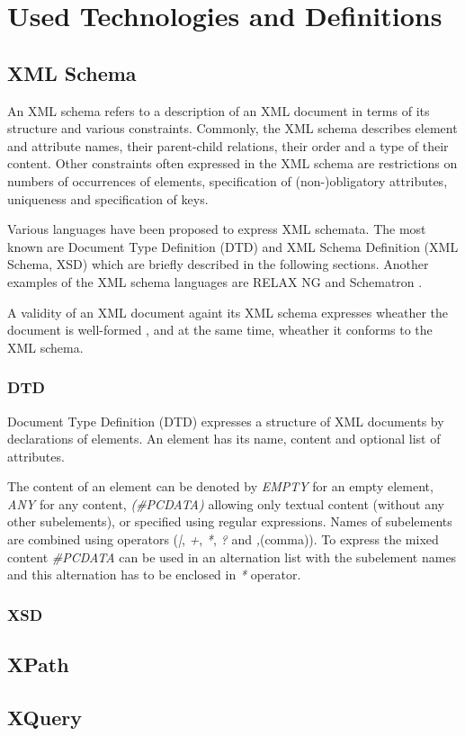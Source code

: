 \chapter{Used Technologies and Definitions}


\section{XML Schema}
An XML schema refers to a description of an XML document in terms of its structure and various constraints. Commonly, the XML schema describes element and attribute names, their parent-child relations, their order and a type of their content. Other constraints often expressed in the XML schema are restrictions on numbers of occurrences of elements, specification of (non-)obligatory attributes, uniqueness and specification of keys.

Various languages have been proposed to express XML schemata. The most known are Document Type Definition (DTD)  and XML Schema Definition (XML Schema, XSD)  which are briefly described in the following sections. Another examples of the XML schema languages are RELAX NG  and  Schematron .

A validity of an XML document againt its XML schema expresses wheather the document is well-formed , and at the same time, wheather it conforms to the XML schema.

\subsection{DTD}
Document Type Definition (DTD) expresses a structure of XML documents by declarations of elements. An element has its name, content and optional list of attributes.

The content of an element can be denoted by \emph{EMPTY} for an empty element, \emph{ANY} for any content, \emph{(\#PCDATA)} allowing only textual content (without any other subelements), or specified using regular expressions. Names of subelements are combined using operators (\emph{|}, \emph{+}, \emph{*}, \emph{?} and \emph{,}(comma)). To express the mixed content \emph{\#PCDATA} can be used in an alternation list with the subelement names and this alternation has to be enclosed in \emph{*} operator.


\subsection{XSD}

\section{XPath}

\section{XQuery}

